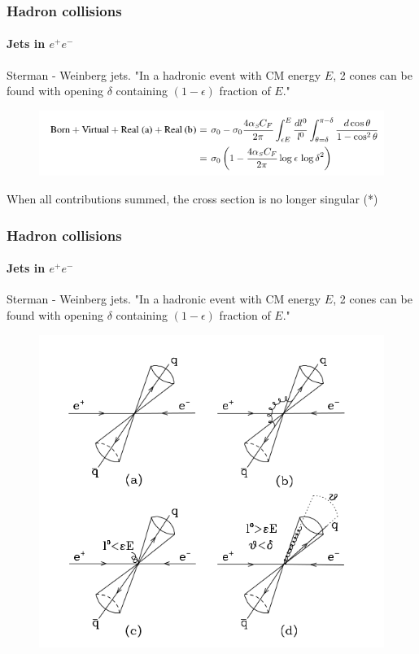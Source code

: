 \documentclass[aspectratio=43]{beamer}
\begin{document}
\begin{frame}

	\frametitle{Hadron collisions}
	\framesubtitle{Jets in $e^{+}e^{-}$}
	
	Sterman - Weinberg jets. "In a hadronic event with CM energy $E$, 2 cones can be found with opening $\delta$ containing $(1 - \epsilon)$ fraction of $E$."
	
	\begin{figure}
		\includegraphics[width = 12 cm]{plots/eq_SW_jets.png}
	\end{figure}

	When all contributions summed, the cross section is no longer singular {\color{red}(*)}
	
\end{frame}

\begin{frame}

	\frametitle{Hadron collisions}
	\framesubtitle{Jets in $e^{+}e^{-}$}
	
	Sterman - Weinberg jets. "In a hadronic event with CM energy $E$, 2 cones can be found with opening $\delta$ containing $(1 - \epsilon)$ fraction of $E$."
	
	\begin{figure}
		\includegraphics[width = 7 cm]{plots/SW_jets.png}
	\end{figure}

\end{frame}


\begin{frame}


\end{frame}
\end{document}
